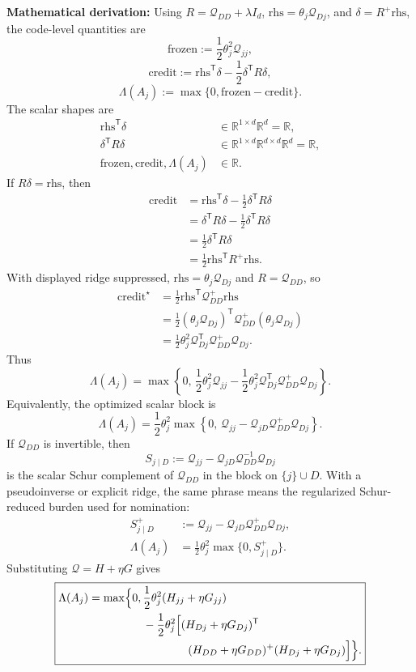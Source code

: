\documentclass[10pt,twocolumn]{article}
\newcommand{\rhs}{\mathrm{rhs}}
\newcommand{\blocktitle}[1]{\vspace{2pt}\noindent\textbf{#1}\space}
\newcommand{\deriv}{\blocktitle{Mathematical derivation:}}
\begin{document}
\deriv
Using \(R=\mathcal Q_{DD}+\lambda I_d\), \(\rhs=\theta_j\mathcal Q_{Dj}\), and \(\delta=R^+\rhs\), the code-level quantities are
\[
\mathrm{frozen}
:=
\frac12\theta_j^2\mathcal Q_{jj},
\]
\[
\mathrm{credit}
:=
\rhs^{\mathsf T}\delta
-\frac12\delta^{\mathsf T}R\delta,
\]
\[
\Lambda(A_j)
:=
\max\{0,\mathrm{frozen}-\mathrm{credit}\}.
\]
The scalar shapes are
\[
\begin{aligned}
\rhs^{\mathsf T}\delta
&\in\mathbb R^{1\times d}\mathbb R^d=\mathbb R,
\\
\delta^{\mathsf T}R\delta
&\in
\mathbb R^{1\times d}\mathbb R^{d\times d}\mathbb R^d
=\mathbb R,
\\
\mathrm{frozen},\mathrm{credit},\Lambda(A_j)&\in\mathbb R .
\end{aligned}
\]
If \(R\delta=\rhs\), then
\[
\begin{aligned}
\mathrm{credit}
&=
\rhs^{\mathsf T}\delta
-\frac12\delta^{\mathsf T}R\delta
\\
&=
\delta^{\mathsf T}R\delta
-\frac12\delta^{\mathsf T}R\delta
\\
&=
\frac12\delta^{\mathsf T}R\delta
\\
&=
\frac12\rhs^{\mathsf T}R^+\rhs .
\end{aligned}
\]
With displayed ridge suppressed, \(\rhs=\theta_j\mathcal Q_{Dj}\) and \(R=\mathcal Q_{DD}\), so
\[
\begin{aligned}
\mathrm{credit}^\star
&=
\frac12\rhs^{\mathsf T}\mathcal Q_{DD}^{+}\rhs
\\
&=
\frac12
(\theta_j\mathcal Q_{Dj})^{\mathsf T}
\mathcal Q_{DD}^{+}
(\theta_j\mathcal Q_{Dj})
\\
&=
\frac12\theta_j^2\mathcal Q_{Dj}^{\mathsf T}\mathcal Q_{DD}^{+}\mathcal Q_{Dj}.
\end{aligned}
\]
Thus
\[
\boxed{
\Lambda(A_j)
=
\max\left\{
0,\,
\frac12\theta_j^2\mathcal Q_{jj}
-\frac12\theta_j^2\mathcal Q_{Dj}^{\mathsf T}\mathcal Q_{DD}^{+}\mathcal Q_{Dj}
\right\}.
}
\]
Equivalently, the optimized scalar block is
\[
\boxed{
\Lambda(A_j)
=
\frac12\theta_j^2
\max\left\{
0,\,
\mathcal Q_{jj}-\mathcal Q_{jD}\mathcal Q_{DD}^{+}\mathcal Q_{Dj}
\right\}.
}
\]
If \(\mathcal Q_{DD}\) is invertible, then
\[
S_{j\mid D}
:=
\mathcal Q_{jj}-\mathcal Q_{jD}\mathcal Q_{DD}^{-1}\mathcal Q_{Dj}
\]
is the scalar Schur complement of \(\mathcal Q_{DD}\) in the block on \(\{j\}\cup D\). With a pseudoinverse or explicit ridge, the same phrase means the regularized Schur-reduced burden used for nomination:
\[
\begin{aligned}
S_{j\mid D}^{+}
&:=
\mathcal Q_{jj}-\mathcal Q_{jD}\mathcal Q_{DD}^{+}\mathcal Q_{Dj},
\\
\Lambda(A_j)
&=
\frac12\theta_j^2\max\{0,S_{j\mid D}^{+}\}.
\end{aligned}
\]
Substituting \(\mathcal Q=H+\eta G\) gives
{\small
\[
\boxed{
\begin{aligned}
\Lambda(A_j)
=
\max\Bigl\{
0,\,
&\frac12\theta_j^2(H_{jj}+\eta G_{jj})
\\
&-\frac12\theta_j^2
\Bigl[
(H_{Dj}+\eta G_{Dj})^{\mathsf T}
\\
&\qquad\qquad
(H_{DD}+\eta G_{DD})^+
(H_{Dj}+\eta G_{Dj})
\Bigr]
\Bigr\}.
\end{aligned}
}
\]
}
\end{document}
